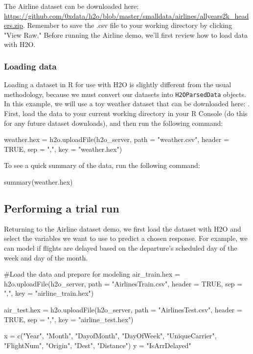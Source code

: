 \documentclass[11pt]{article}
\begin{document}
The Airline dataset can be downloaded here: \url{https://github.com/0xdata/h2o/blob/master/smalldata/airlines/allyears2k_headers.zip}. Remember to save the .csv file to your working directory by clicking  "View Raw."  Before running the Airline demo, we'll first review how to load data with H2O. 

\subsubsection{Loading data} \label{2.5}

Loading a dataset in R for use with H2O is slightly different from the usual methodology, because we must convert our datasets into \texttt{H2OParsedData} objects. In this example, we will use a toy weather dataset that can be downloaded here: . First, load the data to your current working directory in your R Console (do this for any future dataset downloads), and then run the following command:
\begin{spverbatim}
weather.hex = h2o.uploadFile(h2o_server, path = "weather.csv", header = TRUE, sep = ",", key = "weather.hex")
\end{spverbatim}
\bigskip
\noindent
To see a quick summary of the data, run the following command:
\begin{spverbatim}
summary(weather.hex)
\end{spverbatim}


\subsection{Performing a trial run} \label{3.2}
Returning to the Airline dataset demo, we first load the dataset with H2O and select the variables we want to use to predict a chosen response. For example, we can model if flights are delayed based on the departure's scheduled day of the week and day of the month.
\begin{spverbatim}

#Load the data and prepare for modeling
air_train.hex = h2o.uploadFile(h2o_server, path = "AirlinesTrain.csv", header = TRUE, sep = ",", key = "airline_train.hex")

air_test.hex = h2o.uploadFile(h2o_server, path = "AirlinesTest.csv", header = TRUE, sep = ",", key = "airline_test.hex")

x = c("Year", "Month", "DayofMonth", "DayOfWeek", "UniqueCarrier", "FlightNum", "Origin", "Dest", "Distance")
y = "IsArrDelayed" 

\end{spverbatim}
\end{document}
